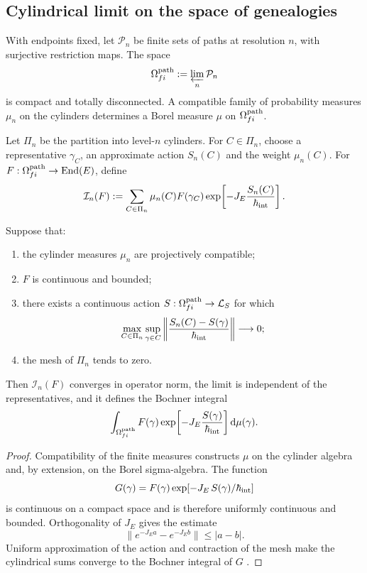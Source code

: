 \subsection{Cylindrical limit on the space of genealogies}

With endpoints fixed, let \(\mathcal P_n\) be finite sets of paths at
resolution \(n\), with surjective restriction maps. The space
\[
 \Omega^{\rm path}_{fi}:=\varprojlim_n\mathcal P_n
\]
is compact and totally disconnected. A compatible family of probability
measures \(\mu_n\) on the cylinders determines a Borel measure
\(\mu\) on \(\Omega^{\rm path}_{fi}\).

Let \(\Pi_n\) be the partition into level-\(n\) cylinders. For
\(C\in\Pi_n\), choose a representative \(\gamma_C\), an approximate action
\(S_n(C)\) and the weight \(\mu_n(C)\). For
\(F:\Omega^{\rm path}_{fi}\to\operatorname{End}(E)\), define
\begin{equation}
 \mathcal I_n(F)
 :=\sum_{C\in\Pi_n}\mu_n(C)F(\gamma_C)
 \exp\!\left[-J_E\frac{S_n(C)}{\hbar_{\rm int}}\right].
 \label{eq:integral-cilindrica-aproximante-rev2}
\end{equation}

\begin{theorem}
\label{thm:integral-genealogica-caminos-rev2}
Suppose that:
\begin{enumerate}
 \item the cylinder measures \(\mu_n\) are projectively compatible;
 \item \(F\) is continuous and bounded;
 \item there exists a continuous action
 \(S:\Omega^{\rm path}_{fi}\to\mathcal L_S\) for which
 \[
  \max_{C\in\Pi_n}\sup_{\gamma\in C}
  \left\|\frac{S_n(C)-S(\gamma)}{\hbar_{\rm int}}\right\|
  \longrightarrow0;
 \]
 \item the mesh of \(\Pi_n\) tends to zero.
\end{enumerate}
Then \(\mathcal I_n(F)\) converges in operator norm, the limit is
independent of the representatives, and it defines the Bochner integral
\begin{equation}
 \int_{\Omega^{\rm path}_{fi}}
 F(\gamma)
 \exp\!\left[-J_E\frac{S(\gamma)}{\hbar_{\rm int}}\right]
 \mathrm d\mu(\gamma).
 \label{eq:integral-genealogica-caminos-rev2}
\end{equation}
\end{theorem}

\begin{proof}
Compatibility of the finite measures constructs \(\mu\) on the cylinder
algebra and, by extension, on the Borel sigma-algebra. The function
\[
 G(\gamma)=F(\gamma)
 \exp[-J_E\,S(\gamma)/\hbar_{\rm int}]
\]
is continuous on a compact space and is therefore uniformly continuous and
bounded. Orthogonality of \(J_E\) gives the estimate
\[
 \|e^{-J_E a}-e^{-J_E b}\|\leq |a-b|.
\]
Uniform approximation of the action and contraction of the mesh make
the cylindrical sums converge to the Bochner integral of \(G\)
\cite{Bochner1955}.
\end{proof}

